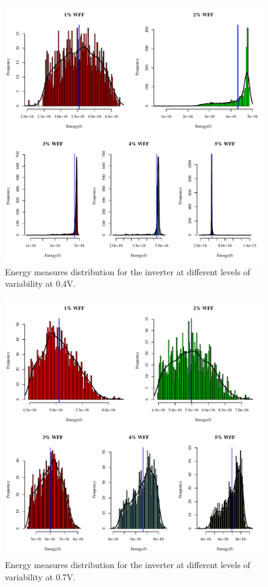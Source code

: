 \documentclass[pgmicro,mestrado,english]{iiufrgs}
\begin{document}
    \begin{figure}[]
        \centering
            \includegraphics[width=1\textwidth, trim={0cm 0cm 0cm 0cm}, clip]{dist_energy_INV_0_4.pdf}
            \caption{Energy measures distribution for the inverter at different levels of variability at 0.4V.}
        \label{fig:energyDist0_4}
    \end{figure}

         \begin{figure}[]
        \centering
            \includegraphics[width=1\textwidth, trim={0cm 0cm 0cm 0cm}, clip]{dist_energy_INV_0_7.pdf}
            \caption{Energy measures distribution for the inverter at different levels of variability at 0.7V.}
        \label{fig:energyDist0_7}
    \end{figure}
\end{document}
